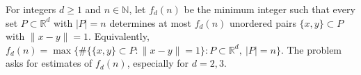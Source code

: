 For integers \(d\ge 1\) and \(n\in\mathbb{N}\), let \(f_d(n)\) be the minimum integer such that every set \(P\subset\mathbb{R}^d\) with \(|P|=n\) determines at most \(f_d(n)\) unordered pairs \(\{x,y\}\subset P\) with \(\|x-y\|=1\).
Equivalently, \(f_d(n)=\max\{\#\{\{x,y\}\subset P:\|x-y\|=1\}: P\subset\mathbb{R}^d,\ |P|=n\}\).
The problem asks for estimates of \(f_d(n)\), especially for \(d=2,3\).
